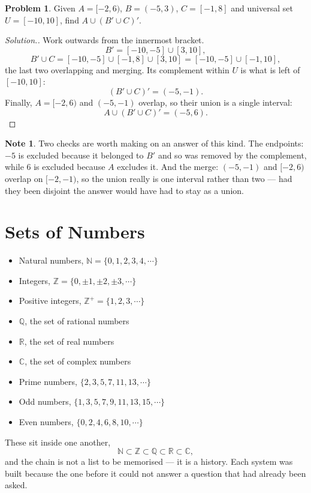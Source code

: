 \documentclass[11pt,a4paper]{article}
\theoremstyle{definition}
\newtheorem{note}[thm]{Note}
\newtheorem{problemx}{Problem}[section]
\newenvironment{problem}{\begin{problemx}}{\end{problemx}}
\newenvironment{solution}
  {\renewcommand{\qedsymbol}{}\begin{proof}[\textit{Solution}.]}
  {\end{proof}}
\begin{document}
\begin{problem}
Given $A=[-2,6)$, $B=(-5,3)$, $C=[-1,8]$ and universal set $U=[-10,10]$, find
$A\cup\left(B'\cup C\right)'$.
\end{problem}

\begin{solution}
Work outwards from the innermost bracket.
$$B'=[-10,-5]\cup[3,10],$$
$$B'\cup C=[-10,-5]\cup[-1,8]\cup[3,10]=[-10,-5]\cup[-1,10],$$
the last two overlapping and merging. Its complement within $U$ is what is left of
$[-10,10]$:
$$\left(B'\cup C\right)'=(-5,-1).$$
Finally, $A=[-2,6)$ and $(-5,-1)$ overlap, so their union is a single interval:
$$A\cup\left(B'\cup C\right)'=(-5,6).$$
\end{solution}

\begin{note}
Two checks are worth making on an answer of this kind. The endpoints: $-5$ is
excluded because it belonged to $B'$ and so was removed by the complement, while
$6$ is excluded because $A$ excludes it. And the merge: $(-5,-1)$ and $[-2,6)$
overlap on $[-2,-1)$, so the union really is one interval rather than two --- had
they been disjoint the answer would have had to stay as a union.
\end{note}

\section{Sets of Numbers}
\begin{itemize}
\item Natural numbers, $\mathbb{N}=\{0,1,2,3,4,\cdots \}$
\item Integers, $\mathbb{Z}=\{0,\pm 1, \pm 2, \pm 3,\cdots \}$
\item Positive integers, $\mathbb{Z}^+=\{1, 2, 3, \cdots \}$
\item $\mathbb{Q}$, the set of rational numbers
\item $\mathbb{R}$, the set of real numbers
\item $\mathbb{C}$, the set of complex numbers
\item Prime numbers, $\{2, 3, 5, 7, 11, 13,\cdots \}$
\item Odd numbers, $\{1, 3, 5, 7, 9, 11, 13, 15, \cdots \}$
\item Even numbers, $\{0, 2, 4, 6, 8, 10, \cdots \}$
\end{itemize}

These sit inside one another,
$$\mathbb{N}\subset\mathbb{Z}\subset\mathbb{Q}\subset\mathbb{R}\subset\mathbb{C},$$
and the chain is not a list to be memorised --- it is a history. Each system was
built because the one before it could not answer a question that had already been
asked.
\end{document}
